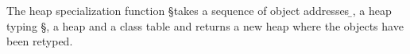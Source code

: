 \documentclass[a4paper,USenglish]{tex/lipics-v2016}
\begin{document}
\begin{mathpar}


\end{mathpar}

The heap specialization function \spec{\b\a}\S\s\K takes a
sequence of object addresses \b\a, a heap typing \S, a heap \s
and a class table \K and returns a new heap where the objects
have been retyped.

\begin{mathpar}

\end{mathpar}
\end{document}
